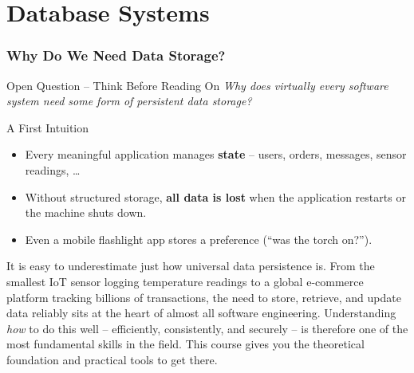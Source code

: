 \section{Database Systems}

\begin{frame}
  \frametitle{Why Do We Need Data Storage?}

  \begin{alertblock}{Open Question -- Think Before Reading On}
    \textit{Why does virtually every software system need some form of persistent data storage?}
  \end{alertblock}

  \vspace{0.5em}
  \begin{block}{A First Intuition}
    \begin{itemize}
      \item Every meaningful application manages \textbf{state} -- users, orders, messages, sensor readings, \ldots
      \item Without structured storage, \textbf{all data is lost} when the application restarts or the machine shuts down.
      \item Even a mobile flashlight app stores a preference (``was the torch on?'').
    \end{itemize}
  \end{block}

  \vspace{0.5em}
  It is easy to underestimate just how universal data persistence is. From the smallest IoT sensor logging temperature readings to a global e-commerce platform tracking billions of transactions, the need to store, retrieve, and update data reliably sits at the heart of almost all software engineering. Understanding \emph{how} to do this well -- efficiently, consistently, and securely -- is therefore one of the most fundamental skills in the field. This course gives you the theoretical foundation and practical tools to get there.
\end{frame}

